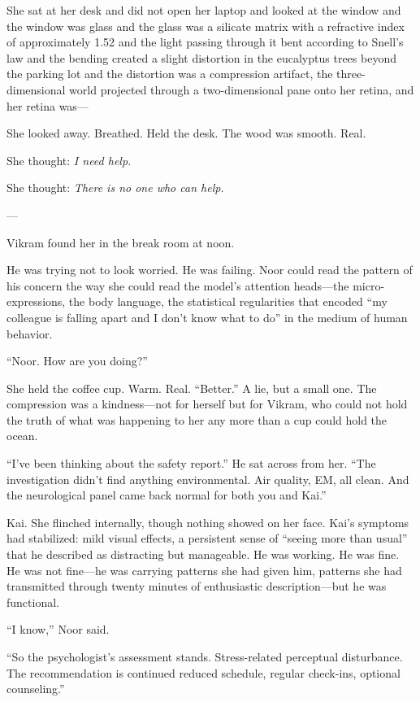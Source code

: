 She sat at her desk and did not open her laptop and looked at the window and the window was glass and the glass was a silicate matrix with a refractive index of approximately 1.52 and the light passing through it bent according to Snell's law and the bending created a slight distortion in the eucalyptus trees beyond the parking lot and the distortion was a compression artifact, the three-dimensional world projected through a two-dimensional pane onto her retina, and her retina was---

She looked away. Breathed. Held the desk. The wood was smooth. Real.

She thought: \textit{I need help.}

She thought: \textit{There is no one who can help.}

---

Vikram found her in the break room at noon.

He was trying not to look worried. He was failing. Noor could read the pattern of his concern the way she could read the model's attention heads---the micro-expressions, the body language, the statistical regularities that encoded ``my colleague is falling apart and I don't know what to do'' in the medium of human behavior.

``Noor. How are you doing?''

She held the coffee cup. Warm. Real. ``Better.'' A lie, but a small one. The compression was a kindness---not for herself but for Vikram, who could not hold the truth of what was happening to her any more than a cup could hold the ocean.

``I've been thinking about the safety report.'' He sat across from her. ``The investigation didn't find anything environmental. Air quality, EM, all clean. And the neurological panel came back normal for both you and Kai.''

Kai. She flinched internally, though nothing showed on her face. Kai's symptoms had stabilized: mild visual effects, a persistent sense of ``seeing more than usual'' that he described as distracting but manageable. He was working. He was fine. He was not fine---he was carrying patterns she had given him, patterns she had transmitted through twenty minutes of enthusiastic description---but he was functional.

``I know,'' Noor said.

``So the psychologist's assessment stands. Stress-related perceptual disturbance. The recommendation is continued reduced schedule, regular check-ins, optional counseling.''

